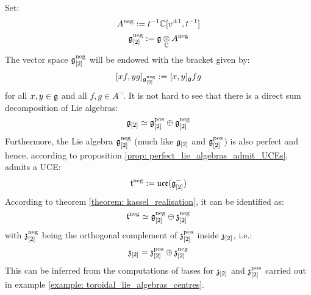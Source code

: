         Set:
            $$A^{\mathrm{neg}} := t^{-1} \mathbb{C}[v^{\pm 1}, t^{-1}]$$
            $$\g_{[2]}^{\negative} := \g \tensor_{\bbC} A^{\negative}$$
        The vector space $\mathfrak{g}_{[2]}^{\mathrm{neg}}$ will be endowed with the bracket given by:
            $$[x f, y g]_{\mathfrak{g}_{[2]}^{\mathrm{neg}}} := [x, y]_{\mathfrak{g}} fg$$
        for all $x, y \in \mathfrak{g}$ and all $f, g \in A^{\neg}$. It is not hard to see that there is a direct sum decomposition of Lie algebras:
            $$\mathfrak{g}_{[2]} \simeq \mathfrak{g}_{[2]}^{\mathrm{pos}} \oplus \mathfrak{g}_{[2]}^{\mathrm{neg}}$$
        Furthermore, the Lie algebra $\mathfrak{g}_{[2]}^{\mathrm{neg}}$ (much like $\mathfrak{g}_{[2]}$ and $\mathfrak{g}_{[2]}^{\mathrm{pos}}$) is also perfect and hence, according to proposition \ref{prop: perfect_lie_algebras_admit_UCEs}, admits a UCE:
            $$\mathfrak{t}^{\mathrm{neg}} := \mathfrak{uce}(\mathfrak{g}_{[2]}^-)$$
        According to theorem \ref{theorem: kassel_realisation}, it can be identified as:
            $$\mathfrak{t}^{\mathrm{neg}} \simeq \mathfrak{g}_{[2]}^{\mathrm{neg}} \oplus \mathfrak{z}_{[2]}^{\mathrm{neg}}$$
        with $\mathfrak{z}_{[2]}^{\mathrm{neg}}$ being the orthogonal complement of $\mathfrak{z}_{[2]}^{\mathrm{pos}}$ inside $\mathfrak{z}_{[2]}$, i.e.:
            $$\mathfrak{z}_{[2]} = \mathfrak{z}_{[2]}^{\mathrm{pos}} \oplus \mathfrak{z}_{[2]}^{\mathrm{neg}}$$
        This can be inferred from the computations of bases for $\mathfrak{z}_{[2]}$ and $\mathfrak{z}_{[2]}^{\mathrm{pos}}$ carried out in example \ref{example: toroidal_lie_algebras_centres}.
        
